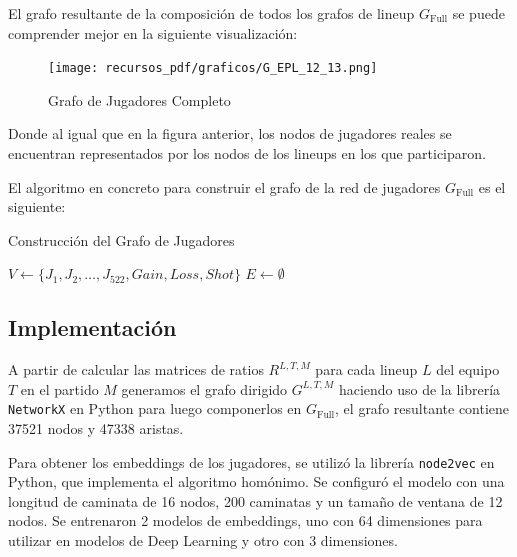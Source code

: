 \documentclass[
  a4paper,
]{article}
\begin{document}
El grafo resultante de la composición de todos los grafos de lineup
\(G_{\text{Full}}\) se puede comprender mejor en la siguiente
visualización:

\begin{figure}
  \texttt{[image: recursos\_pdf/graficos/G\_EPL\_12\_13.png]}
    \caption{Grafo de Jugadores Completo}
\end{figure}

Donde al igual que en la figura anterior, los nodos de jugadores reales
se encuentran representados por los nodos de los lineups en los que
participaron.

El algoritmo en concreto para construir el grafo de la red de jugadores
\(G_{\text{Full}}\) es el siguiente:

\begin{algorithm}[H]
\caption{Construcción del Grafo de Jugadores}\label{alg:cap3}
\SetAlgoLined
{}
$V \gets \{J_1, J_2, \dots, J_{522}, Gain, Loss, Shot\}$\;
$E \gets \emptyset$\;
\end{algorithm}

\hypertarget{implementaciuxf3n}{%
\subsection{Implementación}\label{implementaciuxf3n}}

A partir de calcular las matrices de ratios \(R^{L, T, M}\) para cada
lineup \(L\) del equipo \(T\) en el partido \(M\) generamos el grafo
dirigido \(G^{L, T, M}\) haciendo uso de la librería \texttt{NetworkX}
en Python para luego componerlos en \(G_{\text{Full}}\), el grafo
resultante contiene 37521 nodos y 47338 aristas.

Para obtener los embeddings de los jugadores, se utilizó la librería
\texttt{node2vec} en Python, que implementa el algoritmo homónimo. Se
configuró el modelo con una longitud de caminata de 16 nodos, 200
caminatas y un tamaño de ventana de 12 nodos. Se entrenaron 2 modelos de
embeddings, uno con 64 dimensiones para utilizar en modelos de Deep
Learning y otro con 3 dimensiones.
\end{document}
